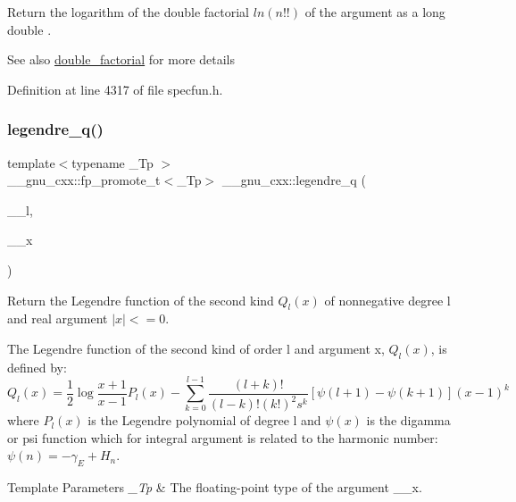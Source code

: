 Return the logarithm of the double factorial $ ln(n!!) $ of the argument as a {\ttfamily  long double }.

\begin{DoxySeeAlso}{See also}
\hyperlink{group__mathsf__gnu_ga1e62c47f84f9782828f8830b4fedc13c}{double\+\_\+factorial} for more details 
\end{DoxySeeAlso}


Definition at line 4317 of file specfun.\+h.

\mbox{\label{group__mathsf__gnu_gadad5b22d0075dca31690907668af568f}} 
\subsubsection{\texorpdfstring{legendre\+\_\+q()}{legendre\_q()}}
{\footnotesize\ttfamily template$<$typename \+\_\+\+Tp $>$ \\
\+\_\+\+\_\+gnu\+\_\+cxx\+::fp\+\_\+promote\+\_\+t$<$\+\_\+\+Tp$>$ \+\_\+\+\_\+gnu\+\_\+cxx\+::legendre\+\_\+q (\begin{DoxyParamCaption}\item[{unsigned int}]{\+\_\+\+\_\+l,  }\item[{\+\_\+\+Tp}]{\+\_\+\+\_\+x }\end{DoxyParamCaption})\hspace{0.3cm}{\ttfamily [inline]}}

Return the Legendre function of the second kind $ Q_l(x) $ of nonnegative degree {\ttfamily l} and real argument $ |x| <= 0 $.

The Legendre function of the second kind of order {\ttfamily l} and argument {\ttfamily x}, $ Q_l(x) $, is defined by\+: \[ Q_l(x) = \frac{1}{2} \log{\frac{x+1}{x-1}} P_l(x) - \sum_{k=0}^{l-1}\frac{(l+k)!}{(l-k)!(k!)^2 s^k} \left[\psi(l+1) - \psi(k+1)\right](x-1)^k \] where $ P_l(x) $ is the Legendre polynomial of degree {\ttfamily l} and $ \psi(x) $ is the digamma or psi function which for integral argument is related to the harmonic number\+: $ \psi(n) = -\gamma_E + H_n $.


\begin{DoxyTemplParams}{Template Parameters}
{\em \+\_\+\+Tp} & The floating-\/point type of the argument {\ttfamily \+\_\+\+\_\+x}. \\
\hline
\end{DoxyTemplParams}


